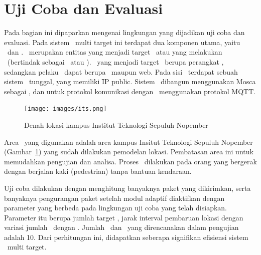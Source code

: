 \section{Uji Coba dan Evaluasi}

Pada bagian ini dipaparkan mengenai lingkungan yang dijadikan uji coba dan
evaluasi. Pada sistem \tracking~multi target ini terdapat dua komponen utama,
yaitu \client~dan \server.  \Client~merupakan entitas yang menjadi target
\tracking~atau yang melakukan \tracking~(bertindak sebagai \publisher~atau
\subscriber). \Client~yang menjadi target \tracking~berupa perangkat
\smartphone, sedangkan pelaku \tracking~dapat berupa \smartphone~maupun
web. Pada sisi \server~terdapat sebuah sistem \pubsub~tunggal, yang memiliki
\f{IP public}. Sistem \pubsub~dibangun menggunakan Mosca sebagai \broker, dan
untuk protokol komunikasi dengan \client~menggunakan protokol MQTT\@.

\begin{figure}
  \centering
  \texttt{[image: images/its.png]}
  \caption{Denah lokasi kampus Institut Teknologi Sepuluh Nopember}
\label{fig:its}
\end{figure}

Area \tracking~yang digunakan adalah area kampus Insitut Teknologi
Sepuluh Nopember (Gambar~\ref{fig:its}) yang sudah dilakukan pemodelan lokasi.
Pembatasan area ini untuk memudahkan pengujian dan analisa. Proses
\tracking~dilakukan pada orang yang bergerak dengan berjalan kaki (pedestrian)
tanpa bantuan kendaraan.

Uji coba dilakukan dengan menghitung banyaknya paket yang dikirimkan, serta
banyaknya pengurangan paket setelah modul adaptif diaktifkan dengan parameter
yang berbeda pada lingkungan uji coba yang telah disiapkan.  Parameter itu
berupa jumlah target \tracking, jarak interval pembaruan lokasi dengan variasi
jumlah \publisher~dengan \subscriber. Jumlah \publisher~dan \subscriber~yang direncanakan
dalam pengujian adalah 10. Dari perhitungan ini, didapatkan seberapa
signifikan efisiensi sistem \tracking~multi target.
